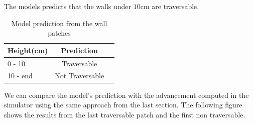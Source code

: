 \documentclass[../document.tex]{subfiles}
\begin{document}
The models predicts that the walls under $10$cm are traversable.
\begin{table}[H]
    \centering
    \begin{tabular}{l|cc}
        Height(cm) & Prediction \\ 
        \hline
        0 - 10  & Traversable \\ 
        10 - end & Not Traversable \\ 
        \hline
    \end{tabular}
    \caption{Model prediction from the wall patches}
\end{table}
We can compare the model's prediction with the advancement computed in the simulator using the same approach from the last section. The following figure shows the results from the last traversable patch and the first non traversable.
\end{document}
